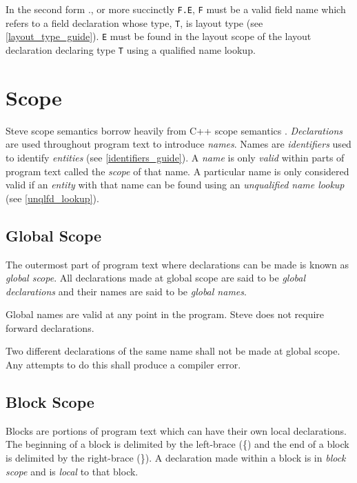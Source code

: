 In the second form ., or more succinctly \texttt{F.E}, \texttt{F} must be a valid field name which refers to a field declaration whose type, \texttt{T}, is layout type (see \ref{layout_type_guide}). \texttt{E} must be found in the layout scope of the layout declaration declaring type \texttt{T} using a qualified name lookup.

\section{Scope} \label{scope_guide}

Steve scope semantics borrow heavily from C++ scope semantics \cite{cpp_std}. \textit{Declarations} are used throughout program text to introduce \textit{names}. Names are \textit{identifiers} used to identify \textit{entities} (see \ref{identifiers_guide}). A \textit{name} is only \textit{valid} within parts of program text called the \textit{scope} of that name. A particular name is only considered valid if an \textit{entity} with that name can be found using an \textit{unqualified name lookup} (see \ref{unqlfd_lookup}). 

\subsection{Global Scope} \label{global_scope}

The outermost part of program text where declarations can be made is known as \textit{global scope}. All declarations made at global scope are said to be \textit{global declarations} and their names are said to be \textit{global names}.

Global names are valid at any point in the program. Steve does not require forward declarations. 

Two different declarations of the same name shall not be made at global scope. Any attempts to do this shall produce a compiler error.

\subsection{Block Scope} \label{block_scope}

Blocks are portions of program text which can have their own local declarations. The beginning of a block is delimited by the left-brace (\{) and the end of a block is delimited by the right-brace (\}). A declaration made within a block is in \textit{block scope} and is \textit{local} to that block.


